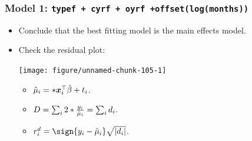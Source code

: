 \documentclass[oneside]{book}\usepackage[]{graphicx}\usepackage[svgnames]{xcolor}
\newenvironment{knitrout}{}{} %
\let\exp\relax%
\let\log\relax%
\DeclarePairedDelimiter\abs{\lvert}{\rvert}
\providecommand{\Vector}[1]{\bm{#1}}%
\begin{document}
\subsubsection*{Model 1: \texttt{typef + cyrf + oyrf +offset(log(months))}}
\begin{itemize}
      \item Conclude that the best fitting model is the main effects model.
      \item Check the residual plot:
\begin{knitrout}
\color{fgcolor}

{\centering \texttt{[image: figure/unnamed-chunk-105-1]} 

}


\end{knitrout}
            \begin{itemize}
                  \item $ \hat{\mu}_i=\exp*{\Vector{x}_i^\top \hat{\beta}+\log{t_i}} $.
                  \item $ D=\sum_{i}2\log*{\frac{y_i}{\hat{\mu}_i}}=\sum_i d_i $.
                  \item $ r_i^d=\sign{y_i-\hat{\mu}_i}\sqrt{\abs{d_i}} $.
            \end{itemize}
\end{itemize}
\end{document}
